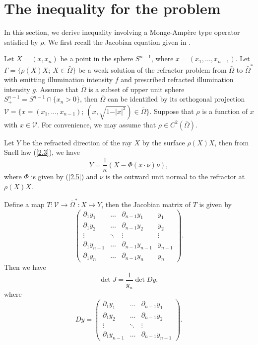 \documentclass[a4paper,12pt,]{article}
\numberwithin{equation}{section}
\numberwithin{equation}{section} \allowdisplaybreaks
\begin{document}
\section{The inequality for the problem}\label{Section 5}

\sloppy{}

In this section, we derive inequality involving a Monge-Amp\`ere type operator satisfied by $\rho$. We first recall the Jacobian equation given in \cite{GM13}.

Let $X = (x,x_{n})$ be a point in the sphere $S^{n-1}$, where $x = (x_{1},\ldots,x_{n-1})$. Let $\Gamma = \{\rho(X)X;~X\in \bar{\Omega}\}$ be a weak solution of the refractor problem from $\bar{\Omega}$ to $\bar{\Omega}^{\ast}$ with emitting illumination intensity $f$ and prescribed refracted illumination intensity $g$. Assume that $\bar{\Omega}$ is a subset of upper unit sphere $S^{n-1}_{+} = S^{n-1} \cap \{x_{n} >0\}$, then $\bar{\Omega}$ can be identified by its orthogonal projection $\mathcal{V} = \{x = (x_{1},\ldots,x_{n-1});~(x,\sqrt{1 - \vert x \vert^{2}}) \in \bar{\Omega}\}$. Suppose that $\rho$ is a function of $x$ with $x \in \mathcal{V}$. For convenience, we may assume that $\rho \in C^{2}(\bar{\Omega})$.

Let $Y$ be the refracted direction of the ray $X$ by the surface $\rho(X)X$, then from Snell law (\ref{2.3}), we have
\begin{equation}\label{5.1}
  Y = \frac{1}{\kappa}(X - \Phi(x \cdot \nu)\nu),
\end{equation}
where $\Phi$ is given by (\ref{2.5}) and $\nu$ is the outward unit normal to the refractor at $\rho(X)X$.

Define a map $T:\mathcal{V}\rightarrow \bar{\Omega}^{\ast}:X \mapsto Y$, then the Jacobian matrix of $T$ is given by
\begin{equation*}
  \left(
  \begin{array}{cccc}
    \partial_{1} y_{1} & \ldots & \partial_{n-1} y_{1} & y_{1} \\
    \partial_{1} y_{2} & \ldots & \partial_{n-1} y_{2} & y_{2} \\
    \vdots & \ddots & \vdots & \vdots \\
    \partial_{1} y_{n-1} & \ldots & \partial_{n-1} y_{n-1} & y_{n-1} \\
    \partial_{1} y_{n} & \ldots & \partial_{n-1} y_{n} & y_{n}
  \end{array}
  \right).
\end{equation*}
Then we have
\begin{equation}\label{5.2}
  \det J = \frac{1}{y_{n}} \det Dy,
\end{equation}
where
\begin{equation*}
  Dy =
  \left(
  \begin{array}{ccc}
    \partial_{1} y_{1} & \ldots & \partial_{n-1} y_{1}  \\
    \partial_{1} y_{2} & \ldots & \partial_{n-1} y_{2} \\
    \vdots & \ddots & \vdots  \\
    \partial_{1} y_{n-1} & \ldots & \partial_{n-1} y_{n-1}
  \end{array}
  \right).
\end{equation*}
\end{document}
